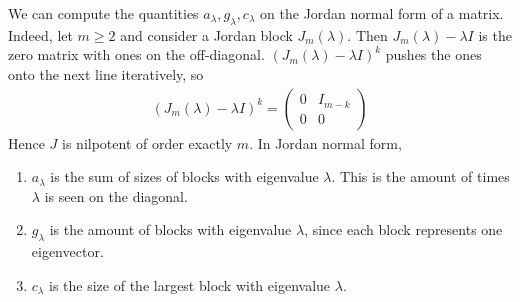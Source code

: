 \begin{remark}
	We can compute the quantities $a_\lambda, g_\lambda, c_\lambda$ on the Jordan normal form of a matrix.
	Indeed, let $m \geq 2$ and consider a Jordan block $J_m(\lambda)$.
	Then $J_m(\lambda) - \lambda I$ is the zero matrix with ones on the off-diagonal.
	$(J_m(\lambda) - \lambda I)^k$ pushes the ones onto the next line iteratively, so
	\begin{align*}
		(J_m(\lambda) - \lambda I)^k = \begin{pmatrix}
			0 & I_{m-k} \\
			0 & 0
		\end{pmatrix}
	\end{align*}
	Hence $J$ is nilpotent of order exactly $m$.
	In Jordan normal form,
	\begin{enumerate}
		\item $a_\lambda$ is the sum of sizes of blocks with eigenvalue $\lambda$.
		      This is the amount of times $\lambda$ is seen on the diagonal.
		\item $g_\lambda$ is the amount of blocks with eigenvalue $\lambda$, since each block represents one eigenvector.
		\item $c_\lambda$ is the size of the largest block with eigenvalue $\lambda$.
	\end{enumerate}
\end{remark}
